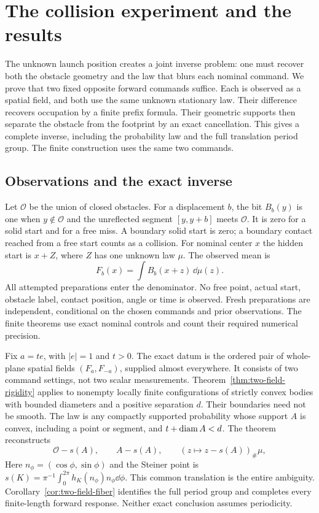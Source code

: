 \section{The collision experiment and the results}
\label{sec:two-field-introduction}
The unknown launch position creates a joint inverse problem: one must
recover both the obstacle geometry and the law that blurs each nominal
command. We prove that two fixed opposite forward commands suffice.
Each is observed as a spatial field, and both use the same unknown
stationary law. Their difference recovers occupation by a finite
prefix formula. Their geometric supports then separate the obstacle
from the footprint by an exact cancellation. This gives a complete
inverse, including the probability law and the full translation
period group. The finite construction uses the same two commands.

\subsection{Observations and the exact inverse}
Let $\mathcal O$ be the union of closed obstacles. For a displacement
$b$, the bit $B_b(y)$ is one when $y\notin\mathcal O$ and the
unreflected segment $[y,y+b]$ meets $\mathcal O$. It is zero for a
solid start and for a free miss. A boundary solid start is zero; a
boundary contact reached from a free start counts as a collision.
For nominal center $x$ the hidden start is $x+Z$, where $Z$ has one
unknown law $\mu$. The observed mean is
\[
                 F_b(x)=\int B_b(x+z)\,\dd\mu(z).
\]
All attempted preparations enter the denominator. No free point,
actual start, obstacle label, contact position, angle or time is
observed. Fresh preparations are independent, conditional on the
chosen commands and prior observations. The finite theorems use exact
nominal controls and count their required numerical precision.

Fix $a=te$, with $|e|=1$ and $t>0$. The exact datum is the ordered
pair of whole-plane spatial fields $(F_a,F_{-a})$, supplied almost
everywhere. It consists of two command settings, not two scalar
measurements. Theorem~\ref{thm:two-field-rigidity} applies to nonempty
locally finite configurations of strictly convex bodies with bounded
diameters and a positive separation $d$. Their boundaries need not
be smooth. The law is any compactly supported probability whose
support $A$ is convex, including a point or segment, and
$t+\operatorname{diam} A<d$. The theorem reconstructs
\[
       \mathcal O-s(A),\qquad A-s(A),\qquad
                   (z\mapsto z-s(A))_\#\mu,
\]
Here $n_\phi=(\cos\phi,\sin\phi)$ and the Steiner point is
$s(K)=\pi^{-1}\int_0^{2\pi}h_K(n_\phi)n_\phi\dd\phi$. This common translation is the
entire ambiguity. Corollary~\ref{cor:two-field-fiber} identifies the
full period group and completes every finite-length forward response.
Neither exact conclusion assumes periodicity.


